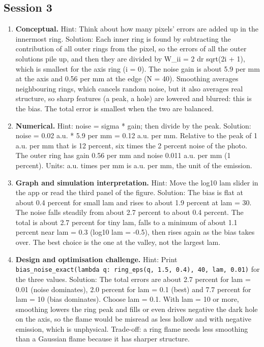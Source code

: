\documentclass[11pt,a4paper]{article}
\begin{document}
\subsection*{Session 3}
\begin{enumerate}[nosep]
\item \textbf{Conceptual.} Hint: Think about how many pixels' errors are added up in the innermost ring. Solution: Each inner ring is found by subtracting the contribution of all outer rings from the pixel, so the errors of all the outer solutions pile up, and then they are divided by W\_ii = 2 dr sqrt(2i + 1), which is smallest for the axis ring (i = 0). The noise gain is about 5.9 per mm at the axis and 0.56 per mm at the edge (N = 40). Smoothing averages neighbouring rings, which cancels random noise, but it also averages real structure, so sharp features (a peak, a hole) are lowered and blurred: this is the bias. The total error is smallest when the two are balanced.
\item \textbf{Numerical.} Hint: noise = sigma * gain; then divide by the peak. Solution: noise = 0.02 a.u. * 5.9 per mm = 0.12 a.u. per mm. Relative to the peak of 1 a.u. per mm that is 12 percent, six times the 2 percent noise of the photo. The outer ring has gain 0.56 per mm and noise 0.011 a.u. per mm (1 percent). Units: a.u. times per mm is a.u. per mm, the unit of the emission.
\item \textbf{Graph and simulation interpretation.} Hint: Move the log10 lam slider in the app or read the third panel of the figure. Solution: The bias is flat at about 0.4 percent for small lam and rises to about 1.9 percent at lam = 30. The noise falls steadily from about 2.7 percent to about 0.4 percent. The total is about 2.7 percent for tiny lam, falls to a minimum of about 1.1 percent near lam = 0.3 (log10 lam = -0.5), then rises again as the bias takes over. The best choice is the one at the valley, not the largest lam.
\item \textbf{Design and optimisation challenge.} Hint: Print \texttt{bias\_noise\_exact(lambda q: ring\_eps(q, 1.5, 0.4), 40, lam, 0.01)} for the three values. Solution: The total errors are about 2.7 percent for lam = 0.01 (noise dominates), 2.0 percent for lam = 0.1 (best) and 7.7 percent for lam = 10 (bias dominates). Choose lam = 0.1. With lam = 10 or more, smoothing lowers the ring peak and fills or even drives negative the dark hole on the axis, so the flame would be misread as less hollow and with negative emission, which is unphysical. Trade-off: a ring flame needs less smoothing than a Gaussian flame because it has sharper structure.
\end{enumerate}
\end{document}
